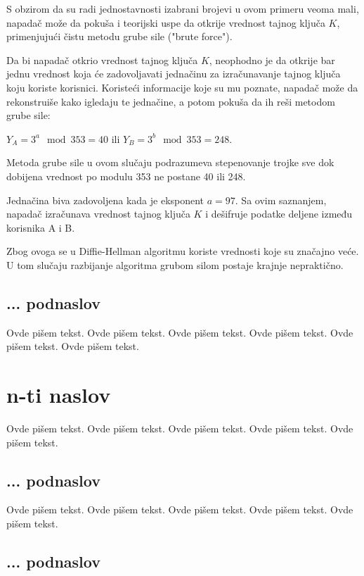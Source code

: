 \documentclass[a4paper]{article}
\begin{document}
{S obzirom da su radi jednostavnosti izabrani brojevi u ovom primeru veoma mali, napadač može da pokuša i teorijski uspe da otkrije vrednost tajnog ključa $K$, primenjujući čistu metodu grube sile ("brute force").

Da bi napadač otkrio vrednost tajnog ključa $K$, neophodno je da otkrije bar jednu vrednost koja će zadovoljavati jednačinu za izračunavanje tajnog ključa koju koriste korisnici. Koristeći informacije koje su mu poznate, napadač može da rekonstruiše kako igledaju te jednačine, a potom pokuša da ih reši metodom grube sile: \\\centerline{$Y_A=3^a\mod353=40$ ili $Y_B=3^b\mod353=248$.}

Metoda grube sile u ovom slučaju podrazumeva stepenovanje trojke sve dok dobijena vrednost po modulu 353 ne postane 40 ili 248.

Jednačina biva zadovoljena kada je eksponent $a=97$. Sa ovim saznanjem, napadač izračunava vrednost tajnog ključa $K$ i dešifruje podatke deljene između korisnika A i B.

Zbog ovoga se u Diffie-Hellman algoritmu koriste vrednosti koje su značajno veće. U tom slučaju razbijanje algoritma grubom silom postaje krajnje nepraktično.
 

\subsection{... podnaslov}
\label{subsec:podnaslovN}

Ovde pišem tekst. 
Ovde pišem tekst. 
Ovde pišem tekst. 
Ovde pišem tekst. 
Ovde pišem tekst. 
Ovde pišem tekst. 

\section{n-ti naslov}
\label{sec:naslovN}

Ovde pišem tekst. 
Ovde pišem tekst. 
Ovde pišem tekst. 
Ovde pišem tekst. 
Ovde pišem tekst. 

\subsection{... podnaslov}
\label{subsec:podnaslovK}

Ovde pišem tekst. 
Ovde pišem tekst. 
Ovde pišem tekst. 
Ovde pišem tekst. 
Ovde pišem tekst. 

\subsection{... podnaslov}
\label{subsec:podnaslovM}

}
\end{document}
